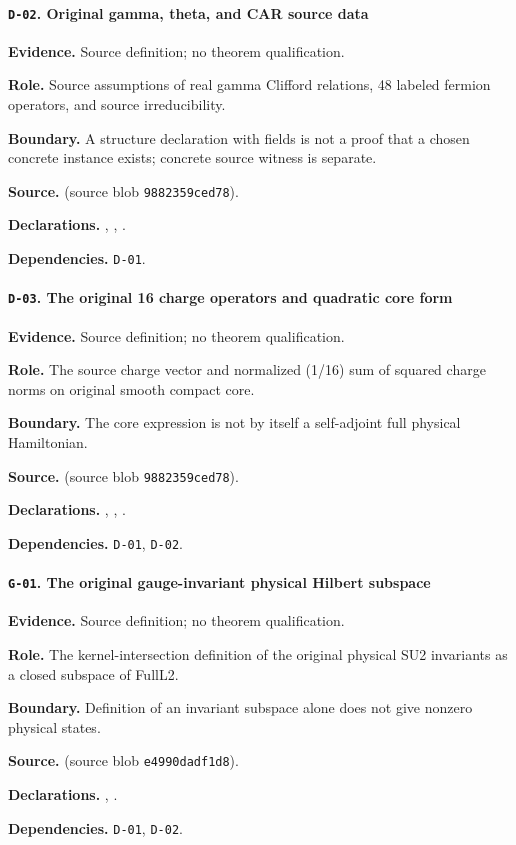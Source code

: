 \paragraph{\texttt{D-02}. Original gamma, theta, and CAR source data}
\noindent\textbf{Evidence.} Source definition; no theorem qualification.
\par\noindent\textbf{Role.} Source assumptions of real gamma Clifford relations, 48 labeled fermion operators, and source irreducibility.
\par\noindent\textbf{Boundary.} A structure declaration with fields is not a proof that a chosen concrete instance exists; concrete source witness is separate.
\par\noindent\textbf{Source.}  (source blob \texttt{9882359ced78}).
\par\noindent\textbf{Declarations.} , , .
\par\noindent\textbf{Dependencies.} \texttt{D-01}.
\medskip

\paragraph{\texttt{D-03}. The original 16 charge operators and quadratic core form}
\noindent\textbf{Evidence.} Source definition; no theorem qualification.
\par\noindent\textbf{Role.} The source charge vector and normalized (1/16) sum of squared charge norms on original smooth compact core.
\par\noindent\textbf{Boundary.} The core expression is not by itself a self-adjoint full physical Hamiltonian.
\par\noindent\textbf{Source.}  (source blob \texttt{9882359ced78}).
\par\noindent\textbf{Declarations.} , , .
\par\noindent\textbf{Dependencies.} \texttt{D-01}, \texttt{D-02}.
\medskip

\paragraph{\texttt{G-01}. The original gauge-invariant physical Hilbert subspace}
\noindent\textbf{Evidence.} Source definition; no theorem qualification.
\par\noindent\textbf{Role.} The kernel-intersection definition of the original physical SU2 invariants as a closed subspace of FullL2.
\par\noindent\textbf{Boundary.} Definition of an invariant subspace alone does not give nonzero physical states.
\par\noindent\textbf{Source.}  (source blob \texttt{e4990dadf1d8}).
\par\noindent\textbf{Declarations.} , .
\par\noindent\textbf{Dependencies.} \texttt{D-01}, \texttt{D-02}.
\medskip

